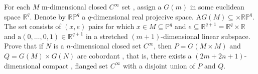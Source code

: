For each $M$ m-dimensional closed $C^{\infty}$ set , assign a $G(m)$ in some euclidean space $\mathbb{R}^{q}$. Denote by $\mathbb{R} \mathbb{P}^{q}$ a $q$-dimensional real projecive space. A$G(M) \subseteq \times \mathbb{R} \mathbb{P}^{q}$. The set consists of $(x,e)$ pairs for which $x \in M \subseteq \mathbb {P}^{q} $ and $e \subseteq \mathbb {R}^{q+1}= \mathbb{R}^{q} \times \mathbb{R}$ and $\mathrm{a} (0, \ldots,0,1) \in \mathbb{R}^{q+1}$ in a stretched $(m+1)$-dimensional linear subspace. Prove that if $N$ is a $n$-dimensional closed set $C^{\infty}$, then $P=G(M \times M)$ and $Q=G(M) \times G(N)$ are cobordant , that is, there exists a $(2m+2n+1)$-dimensional compact , flanged set $C^{\infty}$ with a disjoint union of $P$ and $Q$.